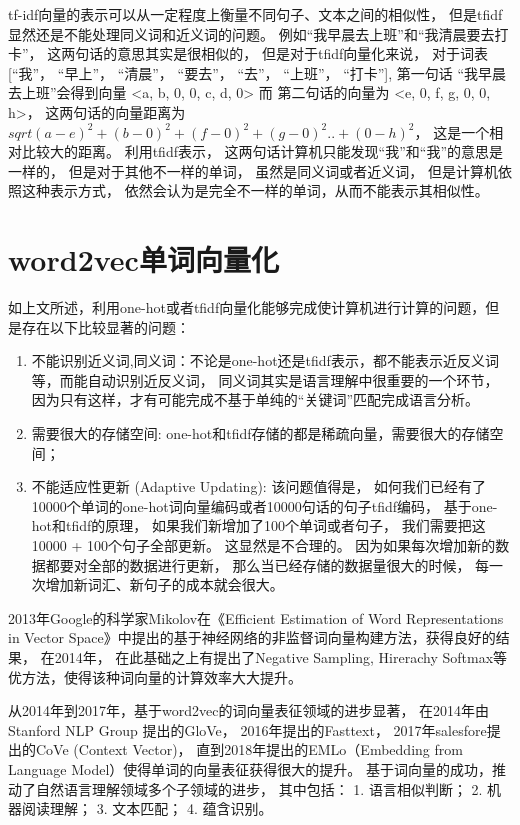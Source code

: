tf-idf向量的表示可以从一定程度上衡量不同句子、文本之间的相似性， 但是tfidf显然还是不能处理同义词和近义词的问题。 例如“我早晨去上班”和“我清晨要去打卡”， 这两句话的意思其实是很相似的， 但是对于tfidf向量化来说， 对于词表 [“我”， “早上”， “清晨”， “要去”， “去”， “上班”， “打卡”], 第一句话 “我早晨去上班”会得到向量 <a, b, 0, 0, c, d, 0> 而 第二句话的向量为 <e, 0, f, g, 0, 0, h>， 这两句话的向量距离为 $sqrt{(a-e)^2 + (b-0)^2 + (f-0)^2 + (g-0)^2 .. + (0 - h) ^ 2}$， 这是一个相对比较大的距离。 利用tfidf表示， 这两句话计算机只能发现“我”和“我”的意思是一样的， 但是对于其他不一样的单词， 虽然是同义词或者近义词， 但是计算机依照这种表示方式， 依然会认为是完全不一样的单词，从而不能表示其相似性。 

\section{word2vec单词向量化}

如上文所述，利用one-hot或者tfidf向量化能够完成使计算机进行计算的问题，但是存在以下比较显著的问题： 

\begin{enumerate}
\item{不能识别近义词,同义词}：不论是one-hot还是tfidf表示，都不能表示近反义词等，而能自动识别近反义词， 同义词其实是语言理解中很重要的一个环节， 因为只有这样，才有可能完成不基于单纯的“关键词”匹配完成语言分析。 
\item{需要很大的存储空间}: one-hot和tfidf存储的都是稀疏向量，需要很大的存储空间；
\item{不能适应性更新 (Adaptive Updating)}: 该问题值得是， 如何我们已经有了10000个单词的one-hot词向量编码或者10000句话的句子tfidf编码， 基于one-hot和tfidf的原理， 如果我们新增加了100个单词或者句子， 我们需要把这10000 + 100个句子全部更新。 这显然是不合理的。 因为如果每次增加新的数据都要对全部的数据进行更新， 那么当已经存储的数据量很大的时候， 每一次增加新词汇、新句子的成本就会很大。 
\end{enumerate}

2013年Google的科学家Mikolov在《Efficient Estimation of Word Representations in Vector Space》\cite{Mikolov:2013:DRW:2999792.2999959}中提出的基于神经网络的非监督词向量构建方法，获得良好的结果， 在2014年， 在此基础之上有提出了Negative Sampling, Hirerachy Softmax等优方法，使得该种词向量的计算效率大大提升。

从2014年到2017年，基于word2vec的词向量表征领域的进步显著， 在2014年由Stanford NLP Group 提出的GloVe， 2016年提出的Fasttext， 2017年salesfore提出的CoVe (Context Vector)， 直到2018年提出的EMLo（Embedding from Language Model）使得单词的向量表征获得很大的提升。 基于词向量的成功，推动了自然语言理解领域多个子领域的进步， 其中包括： 1. 语言相似判断； 2. 机器阅读理解； 3. 文本匹配； 4. 蕴含识别。

